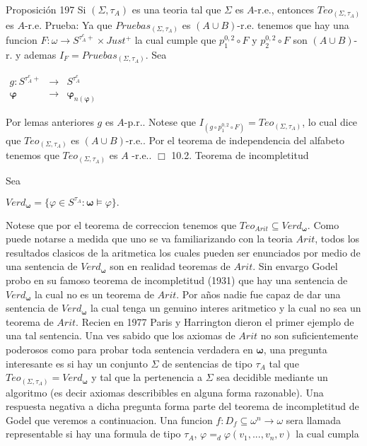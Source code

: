 Proposición 197 Si \((\Sigma ,\tau _{A})\) es una teoria tal que \(\Sigma \) es \(A\)-r.e., entonces \(Teo_{(\Sigma ,\tau _{A})}\) es \(A\)-r.e.
Prueba: Ya que \(Pruebas_{(\Sigma ,\tau _{A})}\) es \((A\cup B)\)-r.e. tenemos que hay una funcion \(F:\omega \rightarrow S^{\tau _{A}^{e}+}\times Just^{+}\) la cual cumple que \(p_{1}^{0,2}\circ F\) y \(p_{2}^{0,2}\circ F\) son \((A\cup B)\)-r. y ademas \(I_{F}=Pruebas_{(\Sigma ,\tau _{A})}\). Sea

\(\displaystyle \begin{array}{ccc} g:S^{\tau _{A}^{e}+} & \rightarrow & S^{\tau _{A}^{e}} \\ \mathbf{\varphi } & \rightarrow & \mathbf{\varphi }_{n(\mathbf{\varphi })} \end{array} \)

Por lemas anteriores \(g\) es \(A\)-p.r.. Notese que \(I_{(g\circ p_{1}^{0,2}\circ F)}=Teo_{(\Sigma ,\tau _{A})}\), lo cual dice que \( Teo_{(\Sigma ,\tau _{A})}\) es \((A\cup B)\)-r.e.. Por el teorema de independencia del alfabeto tenemos que \(Teo_{(\Sigma ,\tau _{A})}\) es \(A\) -r.e.. \(\Box\)
10.2. Teorema de incompletitud

Sea

\(\displaystyle Verd_{\mathbf{\omega }}=\{\varphi \in S^{\tau _{A}}:\mathbf{\omega }\models \varphi \}. \)

Notese que por el teorema de correccion tenemos que \(Teo_{Arit}\subseteq Verd_{\mathbf{\omega }}\). Como puede notarse a medida que uno se va familiarizando con la teoria \(Arit\), todos los resultados clasicos de la aritmetica los cuales pueden ser enunciados por medio de una sentencia de \( Verd_{\mathbf{\omega }}\) son en realidad teoremas de \(Arit\). Sin envargo Godel probo en su famoso teorema de incompletitud (1931) que hay una sentencia de \(Verd_{\mathbf{\omega }}\) la cual no es un teorema de \(Arit\). Por a\~{n}os nadie fue capaz de dar una sentencia de \(Verd_{\mathbf{\omega } } \) la cual tenga un genuino interes aritmetico y la cual no sea un teorema de \(Arit\). Recien en 1977 Paris y Harrington dieron el primer ejemplo de una tal sentencia. Una ves sabido que los axiomas de \(Arit\) no son suficientemente poderosos como para probar toda sentencia verdadera en \( \mathbf{\omega }\), una pregunta interesante es si hay un conjunto \(\Sigma \) de sentencias de tipo \(\tau _{A}\) tal que \(Teo_{(\Sigma ,\tau _{A})}=Verd_{ \mathbf{\omega }}\) y tal que la pertenencia a \(\Sigma \) sea decidible mediante un algoritmo (es decir axiomas describibles en alguna forma razonable). Una respuesta negativa a dicha pregunta forma parte del teorema de incompletitud de Godel que veremos a continuacion.
Una funcion \(f:D_{f}\subseteq \omega ^{n}\rightarrow \omega \) sera llamada representable si hay una formula de tipo \(\tau _{A}\), \(\varphi =_{d}\varphi (v_{1},...,v_{n},v)\) la cual cumpla

